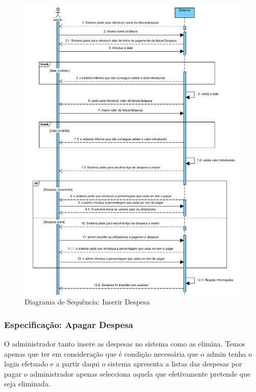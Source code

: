 \begin{figure}[htb!]
	\centering
	\includegraphics[scale=0.5]{imagens/DiagramaSeq/InserirDespesa}  
	\caption{Diagrama de Sequência: Inserir Despesa}  
\end{figure}

\newpage \clearpage

\subsubsection{Especificação: Apagar Despesa}

O administrador tanto insere as despesas no sistema como as elimina. Temos apenas que ter em consideração que é condição necessária que o admin tenha o login efetuado e a partir daqui o sistema apresenta a listas das despesas por pagar o administrador apenas selecciona aquela que efetivamente pretende que seja eliminada.

